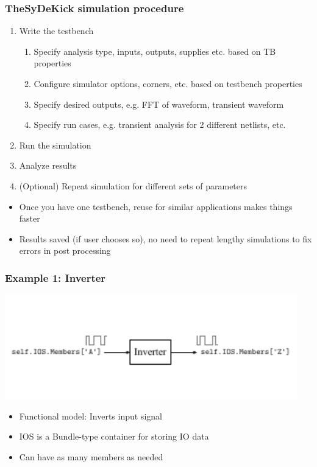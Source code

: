 \documentclass{sdkslides}
\newcommand{\sectname}{Section Name}
\begin{document}
\renewcommand{\sectname}{TheSyDeKick simulation procedure}
\begin{frame}[t]
    \frametitle{\sectname}
        \begin{enumerate}
            \item Write the testbench
            \begin{enumerate}
                \item Specify analysis type, inputs, outputs, supplies etc. based on TB properties
                \item Configure simulator options, corners, etc. based on
                    testbench properties
                \item Specify desired outputs, e.g. FFT of waveform, transient waveform
                \item Specify run cases, e.g. transient analysis for 2 different netlists, etc.
            \end{enumerate}
            \item Run the simulation
            \item Analyze results
            \item (Optional) Repeat simulation for different sets of parameters
        \end{enumerate}
        \begin{itemize}
            \item Once you have one testbench, reuse for similar applications makes things faster
            \item Results saved (if user chooses so), no need to repeat lengthy simulations to fix errors in post processing
        \end{itemize}
\end{frame}



\renewcommand{\sectname}{Example 1: Inverter}
\begin{frame}[t]
    \frametitle{\sectname}
    \centering
    \includegraphics[width=0.95\textwidth]{Pics/inverter_single_1}
    \begin{itemize}
        \item Functional model: Inverts input signal
        \item IOS is a Bundle-type container for storing IO data
        \item Can have as many members as needed
    \end{itemize}
\end{frame}
\end{document}
